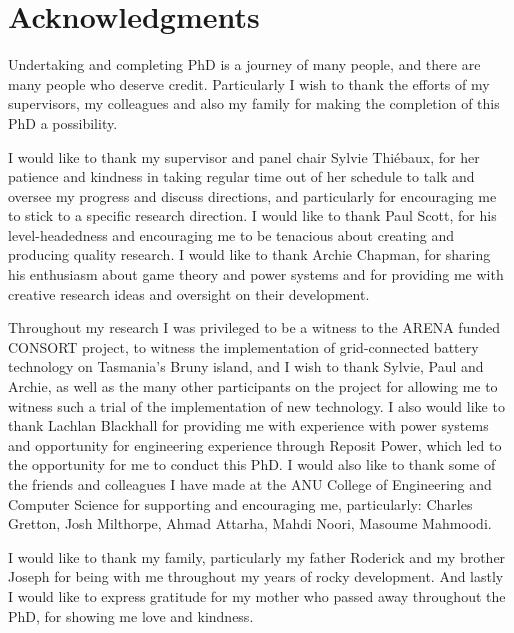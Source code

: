 \chapter*{Acknowledgments}

Undertaking and completing PhD is a journey of many people, and there are many people who deserve credit.
Particularly I wish to thank the efforts of my supervisors, my colleagues and also my family for making the completion of this PhD a possibility.

I would like to thank my supervisor and panel chair Sylvie Thi\'{e}baux, for her patience and kindness in taking regular time out of her schedule to talk and oversee my progress and discuss directions, and particularly for encouraging me to stick to a specific research direction.
I would like to thank Paul Scott, for his level-headedness and encouraging me to be tenacious about creating and producing quality research.
I would like to thank Archie Chapman, for sharing his enthusiasm about game theory and power systems and for providing me with creative research ideas and oversight on their development.

Throughout my research I was privileged to be a witness to the ARENA funded CONSORT project, to witness the implementation of grid-connected battery technology on Tasmania's Bruny island, and I wish to thank Sylvie, Paul and Archie, as well as the many other participants on the project for allowing me to witness such a trial of the implementation of new technology.
I also would like to thank Lachlan Blackhall for providing me with experience with power systems and opportunity for engineering experience through Reposit Power, which led to the opportunity for me to conduct this PhD.
I would also like to thank some of the friends and colleagues I have made at the ANU College of Engineering and Computer Science for supporting and encouraging me, particularly: Charles Gretton, Josh Milthorpe, Ahmad Attarha, Mahdi Noori, Masoume Mahmoodi.

I would like to thank my family, particularly my father Roderick and my brother Joseph for being with me throughout my years of rocky development.
And lastly I would like to express gratitude for my mother who passed away throughout the PhD, for showing me love and kindness.
